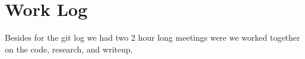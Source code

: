 \documentclass[onecolumn, draftclsnofoot,10pt, compsoc]{IEEEtran}
\begin{document}
\section{Work Log}

Besides for the git log we had two 2 hour long meetings were we worked together on the code, research, and writeup.



\end{document}
